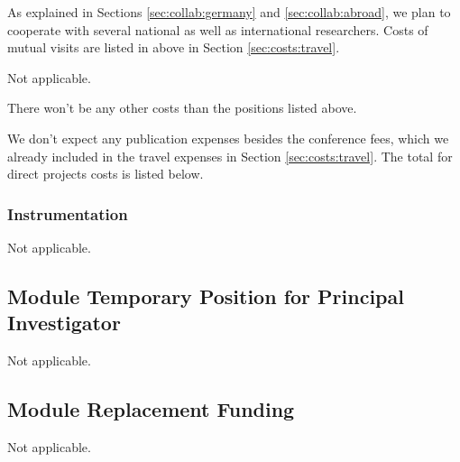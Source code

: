 \begin{funds}
\end{funds}


As explained in Sections \ref{sec:collab:germany} and \ref{sec:collab:abroad}, we plan to cooperate with several national as well as international researchers. Costs of mutual visits are listed in above in Section \ref{sec:costs:travel}.


Not applicable. 


There won't be any other costs than the positions listed above. 


We don't expect any publication expenses besides the conference fees, which we already included in the travel expenses in Section \ref{sec:costs:travel}. The total for direct projects costs is listed below. 

\subsubsection{Instrumentation}

Not applicable. 

\subsection{Module Temporary Position for Principal Investigator}

Not applicable. 

\subsection{Module Replacement Funding}

Not applicable. 